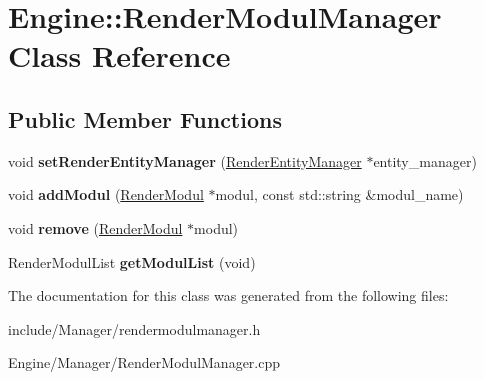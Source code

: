 \hypertarget{classEngine_1_1RenderModulManager}{}\section{Engine\+:\+:Render\+Modul\+Manager Class Reference}
\label{classEngine_1_1RenderModulManager}
\subsection*{Public Member Functions}
\begin{DoxyCompactItemize}
\item 
\hypertarget{classEngine_1_1RenderModulManager_a44e24448e5ff4000310c2674e8cea047}{}void {\bfseries set\+Render\+Entity\+Manager} (\hyperlink{classEngine_1_1RenderEntityManager}{Render\+Entity\+Manager} $\ast$entity\+\_\+manager)\label{classEngine_1_1RenderModulManager_a44e24448e5ff4000310c2674e8cea047}

\item 
\hypertarget{classEngine_1_1RenderModulManager_a1ac160d546436a23eab7f23130b0dc53}{}void {\bfseries add\+Modul} (\hyperlink{classEngine_1_1RenderModul}{Render\+Modul} $\ast$modul, const std\+::string \&modul\+\_\+name)\label{classEngine_1_1RenderModulManager_a1ac160d546436a23eab7f23130b0dc53}

\item 
\hypertarget{classEngine_1_1RenderModulManager_aa37ce4d2ddcf621f538456251712c3ff}{}void {\bfseries remove} (\hyperlink{classEngine_1_1RenderModul}{Render\+Modul} $\ast$modul)\label{classEngine_1_1RenderModulManager_aa37ce4d2ddcf621f538456251712c3ff}

\item 
\hypertarget{classEngine_1_1RenderModulManager_ac8ac2e7e4b67de1dcc2d934ca63cdc07}{}Render\+Modul\+List {\bfseries get\+Modul\+List} (void)\label{classEngine_1_1RenderModulManager_ac8ac2e7e4b67de1dcc2d934ca63cdc07}

\end{DoxyCompactItemize}


The documentation for this class was generated from the following files\+:\begin{DoxyCompactItemize}
\item 
include/\+Manager/rendermodulmanager.\+h\item 
Engine/\+Manager/Render\+Modul\+Manager.\+cpp\end{DoxyCompactItemize}
